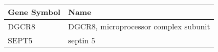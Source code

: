 \begin{tabular}{ll}
\toprule
Gene Symbol &                                  Name \\
\midrule
      DGCR8 & DGCR8, microprocessor complex subunit \\
      SEPT5 &                              septin 5 \\
\bottomrule
\end{tabular}
